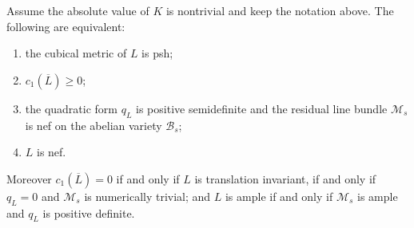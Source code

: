 \begin{theorem}
\label{thm:ch19-canonical-positivity}
Assume the absolute value of $K$ is nontrivial and keep the notation
above.  The following are equivalent:
\begin{enumerate}
\item\label{itm:ch19-pos:psh} the cubical metric of $L$ is psh;
\item\label{itm:ch19-pos:current} $c_1(\overline L)\geq0$;
\item\label{itm:ch19-pos:data} the quadratic form $q_L$ is positive
 semidefinite and the residual line bundle $\mathcal M_s$ is nef on the
 abelian variety $\mathcal B_s$;
\item\label{itm:ch19-pos:nef} $L$ is nef.
\end{enumerate}
Moreover $c_1(\overline L)=0$ if and only if $L$ is translation
invariant, if and only if $q_L=0$ and $\mathcal M_s$ is numerically
trivial; and $L$ is ample if and only if $\mathcal M_s$ is ample and
$q_L$ is positive definite.
\end{theorem}

